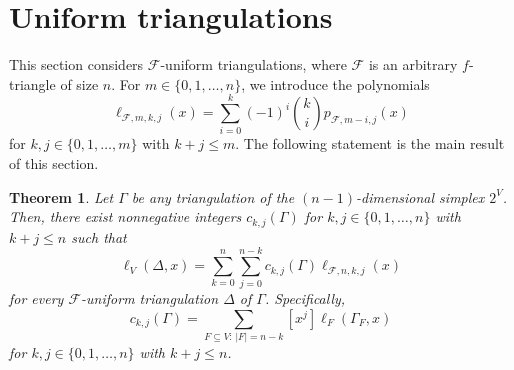 \documentclass[11pt]{amsart}
\newtheorem{theorem}{Theorem}[section]
\newcommand{\fF}{{\mathcal F}}
\begin{document}
\section{Uniform triangulations}
\label{sec:uniform}

This section considers $\fF$-uniform triangulations, 
where $\fF$ is an arbitrary $f$-triangle of size $n$.
For $m \in \{0, 1,\dots,n\}$, we introduce the 
polynomials 
%
\begin{equation} \label{eq:lnkj-def}
\ell_{\fF,m,k,j}(x) = \sum_{i=0}^k (-1)^i {k \choose i}
                      p_{\fF,m-i,j}(x)
\end{equation}
%
for $k, j \in \{0, 1,\dots,m\}$ with $k + j \le m$.
The following statement is the main result of this 
section.
%
\begin{theorem} \label{thm:uniform} 
Let $\Gamma$ be any triangulation of the 
$(n-1)$-dimensional simplex $2^V$. Then, there exist 
nonnegative integers $c_{k,j}(\Gamma)$ for $k, j \in 
\{0, 1,\dots,n\}$ with $k + j \le n$ such that 
%
\begin{equation} \label{eq:local-uniform}
\ell_V(\Delta,x) = \sum_{k=0}^n 
\sum_{j=0}^{n-k} c_{k,j}(\Gamma) \ell_{\fF,n,k,j}(x)
\end{equation}
%
for every $\fF$-uniform triangulation $\Delta$ of 
$\Gamma$. Specifically,
%
\begin{equation} \label{eq:ckj}
c_{k,j}(\Gamma) = \sum_{F \subseteq V: \, |F|=n-k} 
                  [x^j] \ell_F(\Gamma_F,x) 
\end{equation}
%
for $k, j \in \{0, 1,\dots,n\}$ with $k + j \le n$.
\end{theorem}
\end{document}
